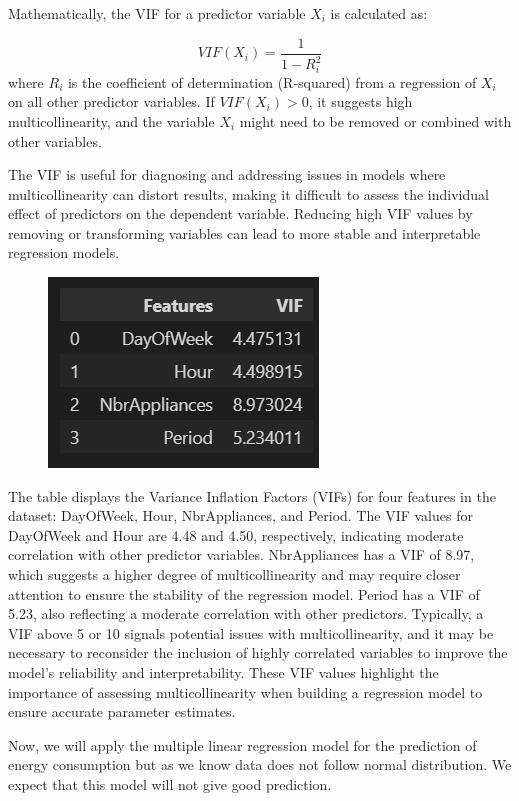 \documentclass[english,12pt, titlepage]{article}
\begin{document}
	Mathematically, the VIF for a predictor variable $X_{i}$
	is calculated as:
	
	\begin{equation*}
		VIF(X_{i}) = \frac{1}{1-R_{i}^{2}}
	\end{equation*}
	where $R_{i}$ 
	is the coefficient of determination (R-squared) from a regression of  $X_{i}$ on all other predictor variables. If $VIF(X_{i})>0$, it suggests high multicollinearity, and the variable $X_{i}$ might need to be removed or combined with other variables.
	
	
	
	The VIF is useful for diagnosing and addressing issues in models where multicollinearity can distort results, making it difficult to assess the individual effect of predictors on the dependent variable. Reducing high VIF values by removing or transforming variables can lead to more stable and interpretable regression models.
	
	
	
	\begin{figure}[!ht]
		\centering
		\includegraphics[width=0.35\linewidth]{fig9.jpg}
		\label{fig10}
	\end{figure}
	
	The table displays the Variance Inflation Factors (VIFs) for four features in the dataset: DayOfWeek, Hour, NbrAppliances, and Period. The VIF values for DayOfWeek and Hour are 4.48 and 4.50, respectively, indicating moderate correlation with other predictor variables. NbrAppliances has a VIF of 8.97, which suggests a higher degree of multicollinearity and may require closer attention to ensure the stability of the regression model. Period has a VIF of 5.23, also reflecting a moderate correlation with other predictors. Typically, a VIF above 5 or 10 signals potential issues with multicollinearity, and it may be necessary to reconsider the inclusion of highly correlated variables to improve the model's reliability and interpretability. These VIF values highlight the importance of assessing multicollinearity when building a regression model to ensure accurate parameter estimates.
	
	Now, we will apply the multiple linear regression model for the prediction of energy consumption but as we know data does not follow normal distribution. We expect that this model will not give good prediction. 
	
\end{document}
